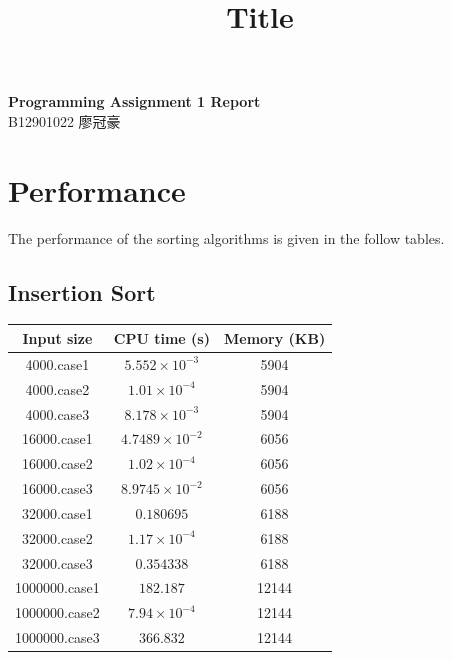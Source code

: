 \documentclass[11pt]{article}
\theoremstyle{definition}
\begin{document}
\setcounter{section}{0}
\title{Title}

\thispagestyle{empty}
\begin{center}
  {\large \bf Programming Assignment 1 Report} \\ 
  B12901022 廖冠豪
\end{center}
\section*{Performance}
The performance of the sorting algorithms is given in the follow tables.
\subsection*{Insertion Sort}
\begin{center}
  \begin{tabular}{|c|c|c|}
    \hline 
    Input size & CPU time (s) & Memory (KB) \\ 
    \hline 
    4000.case1 & $5.552 \times 10^{-3}$ & 5904 \\ 
    \hline
    4000.case2 & $1.01 \times 10^{-4}$ & 5904 \\ 
    \hline
    4000.case3 & $8.178 \times 10^{-3}$ & 5904 \\
    \hline
    16000.case1 & $4.7489 \times 10^{-2}$ & 6056 \\ 
    \hline 
    16000.case2 & $1.02 \times 10^{-4}$ & 6056 \\ 
    \hline
    16000.case3 & $8.9745 \times 10^{-2}$ & 6056 \\ 
    \hline 
    32000.case1 & $0.180695$ & 6188 \\ 
    \hline 
    32000.case2 & $1.17 \times 10^{-4}$ & 6188 \\ 
    \hline
    32000.case3 & $0.354338$ & 6188 \\
    \hline 
    1000000.case1 & $182.187$ & 12144 \\ 
    \hline 
    1000000.case2 & $7.94 \times 10^{-4}$ & 12144 \\ 
    \hline 
    1000000.case3 & $366.832$ & 12144 \\
    \hline
  \end{tabular}
\end{center}
\end{document}
